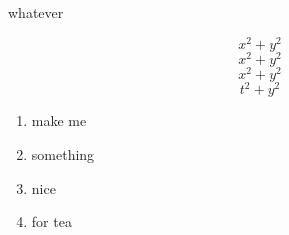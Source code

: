 \documentclass{article}
\begin{document}
\begin{center}
	\Large{whatever}
\end{center}

\vspace{.5in}
$$x^2 + y^2$$
$$x^2 + y^2$$
$$x^2 + y^2$$
$$t^2 + y^2$$

\hline
\vspace{.5in}

\begin{enumerate}
\item make me
\item something
\item nice
\item for tea
\end{enumerate}
\end{document}
